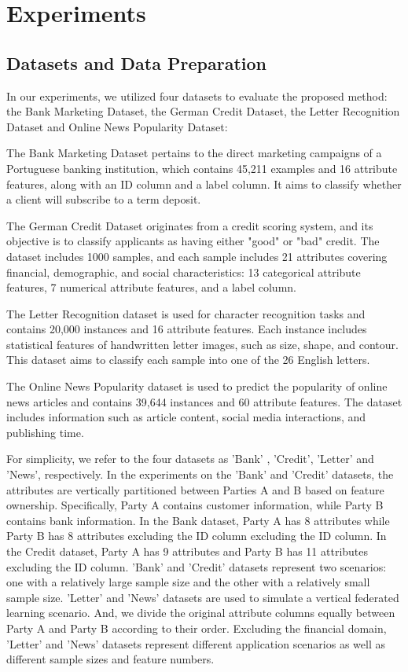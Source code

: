\documentclass[final,1p,times]{elsarticle}
\begin{document}
\section{Experiments}
\label{sec4}

\subsection{Datasets and Data Preparation}
\label{subsec41}
In our experiments, we utilized four datasets\cite{36} to evaluate the proposed method: the Bank Marketing Dataset, the German Credit Dataset, the Letter Recognition Dataset and Online News Popularity Dataset: 

The Bank Marketing Dataset pertains to the direct marketing campaigns of a Portuguese banking institution, which contains 45,211 examples and 16 attribute features, along with an ID column and a label column. It aims to classify whether a client will subscribe to a term deposit. 

The German Credit Dataset originates from a credit scoring system, and its objective is to classify applicants as having either "good" or "bad" credit. The dataset includes 1000 samples, and each sample includes 21 attributes covering financial, demographic, and social characteristics: 13 categorical attribute features, 7 numerical attribute features, and a label column. 

The Letter Recognition dataset is used for character recognition tasks and contains 20,000 instances and 16 attribute features. Each instance includes statistical features of handwritten letter images, such as size, shape, and contour. This dataset aims to classify each sample into one of the 26 English letters. 

The Online News Popularity dataset is used to predict the popularity of online news articles and contains 39,644 instances and 60 attribute features. The dataset includes information such as article content, social media interactions, and publishing time. 

For simplicity, we refer to the four datasets as 'Bank' , 'Credit', 'Letter' and 'News', respectively. In the experiments on the 'Bank' and 'Credit' datasets, the attributes are vertically partitioned between Parties A and B based on feature ownership. Specifically, Party A contains customer information, while Party B contains bank information. In the Bank dataset, Party A has 8 attributes while Party B has 8 attributes excluding the ID column excluding the ID column. In the Credit dataset, Party A has 9 attributes and Party B has 11 attributes excluding the ID column. 'Bank' and 'Credit' datasets represent two scenarios: one with a relatively large sample size and the other with a relatively small sample size. 'Letter' and 'News' datasets are used to simulate a vertical federated learning scenario. And, we divide the original attribute columns equally between Party A and Party B according to their order. Excluding the financial domain, 'Letter' and 'News' datasets represent different application scenarios as well as different sample sizes and feature numbers. 
\end{document}
